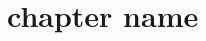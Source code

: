 \documentclass[../main.tex]{subfiles}
\begin{document}
\chapter{chapter name} %
\label{cha:chapter_name}

\end{document}
